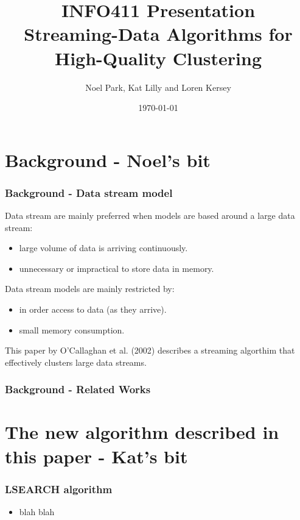 \documentclass{beamer}
\title{INFO411 Presentation \\ Streaming-Data Algorithms for High-Quality Clustering}
\author{Noel Park, Kat Lilly and Loren Kersey}
\date{\today}
\begin{document}
\frame{\titlepage}

\section[Outline]{}
\frame{\tableofcontents}

\section{Background - Noel's bit}

\frame
{
  \frametitle{Background - Data stream model}
  
  Data stream are mainly preferred when models are based around a large data stream:

  \begin{itemize}
    \item large volume of data is arriving continuously.
    \item unnecessary or impractical to store data in memory.
    \newline
  \end{itemize}

  Data stream models are mainly restricted by:
  \begin{itemize}
    \item in order access to data (as they arrive).
    \item small memory consumption.
    \newline
  \end{itemize}

  This paper by O'Callaghan et al. (2002) describes a streaming algorthim that effectively clusters large data streams.

}

\frame
{
  \frametitle{Background - Related Works}
  

}

\section{The new algorithm described in this paper - Kat's bit}
\frame
{
  \frametitle{LSEARCH algorithm}

  \begin{itemize}
  \item  blah blah
  \end{itemize}
}
\end{document}
